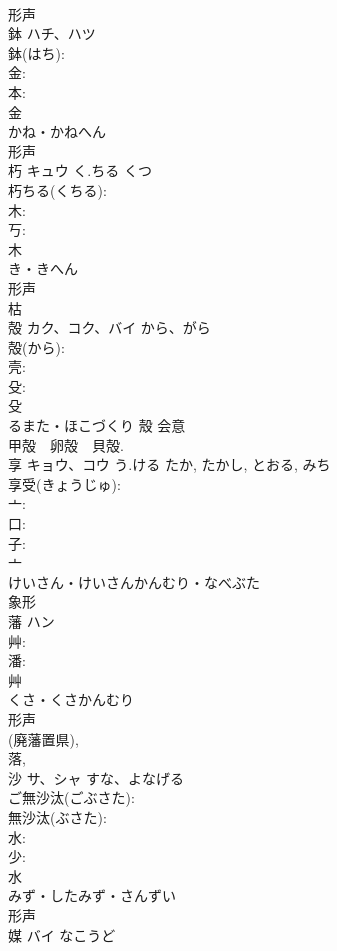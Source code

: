 \documentclass[8pt]{extreport}
\begin{document}
\begin{CJK}{UTF8}{min}
\\	形声 
\\	鉢	ハチ、ハツ			
\\	鉢(はち): 
\\	金: 
\\	本: 
\\	金	
\\	かね・かねへん	
\\	形声 
\\	朽	キュウ	く.ちる	くつ	
\\	朽ちる(くちる): 
\\	木: 
\\	丂: 
\\	木	
\\	き・きへん	
\\	形声 
\\	枯 
\\	殻	カク、コク、バイ	から、がら		
\\	殻(から): 
\\	壳: 
\\	殳: 
\\	殳	
\\	るまた・ほこづくり	殼	会意 
\\	甲殻　卵殻　貝殻.	
\\	享	キョウ、コウ	う.ける	たか, たかし, とおる, みち	
\\	享受(きょうじゅ): 
\\	亠: 
\\	口: 
\\	子: 
\\	亠	
\\	けいさん・けいさんかんむり・なべぶた	
\\	象形 
\\	藩	ハン			
\\	艸: 
\\	潘: 
\\	艸	
\\	くさ・くさかんむり	
\\	形声 
\\	(廃藩置県), 
\\	落, 
\\	沙	サ、シャ	すな、よなげる		
\\	ご無沙汰(ごぶさた): 
\\	無沙汰(ぶさた): 
\\	水: 
\\	少: 
\\	水	
\\	みず・したみず・さんずい	
\\	形声 
\\	媒	バイ	なこうど		

\end{CJK}
\end{document}
